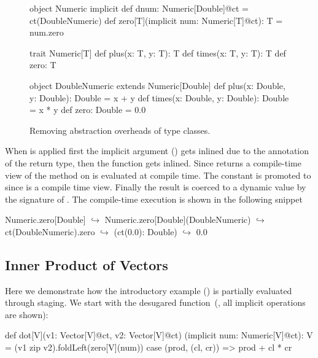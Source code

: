 \begin{figure}
\begin{listing}
object Numeric {
  implicit def dnum: Numeric[Double]@ct =
    ct(DoubleNumeric)
  def zero[T](implicit num: Numeric[T]@ct): T =
    num.zero
}

trait Numeric[T] {
  def plus(x: T, y: T): T
  def times(x: T, y: T): T
  def zero: T
}

object DoubleNumeric extends Numeric[Double] {
  def plus(x: Double, y: Double): Double = x + y
  def times(x: Double, y: Double): Double = x * y
  def zero: Double = 0.0
}
\end{listing}
\caption{\label{fig:numeric} Removing abstraction overheads of type classes.}
\end{figure}

When  is applied first the implicit argument () gets
inlined due to the  annotation of the return type, then the function  gets
inlined. Since  returns a compile-time view of 
the method  on  is evaluated at compile time. The constant  is
promoted to  since  is a compile time view. Finally the  result
is coerced to a dynamic value by the signature of . The
compile-time execution is shown in the following snippet

\begin{lstparagraph}
Numeric.zero[Double]
  $\hookrightarrow$ Numeric.zero[Double](DoubleNumeric)
  $\hookrightarrow$ ct(DoubleNumeric).zero
  $\hookrightarrow$ (ct(0.0): Double)
  $\hookrightarrow$ 0.0
\end{lstparagraph}

\subsection{Inner Product of Vectors}
\label{sct:dot-product}

Here we demonstrate how the introductory example () is
partially evaluated through staging. We start with the desugared 
function~(\ie, all implicit operations are shown):

\begin{lstparagraph}
 def dot[V](v1: Vector[V]@ct, v2: Vector[V]@ct)
  (implicit num: Numeric[V]@ct): V =
  (v1 zip v2).foldLeft(zero[V](num)) {
    case (prod, (cl, cr)) => prod + cl * cr
  }
\end{lstparagraph}

